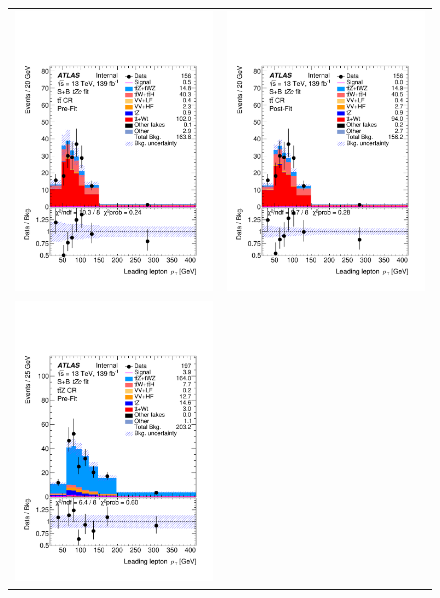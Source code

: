\begin{figure}[htbp]
	\centering
	\begin{tabular}{cc}
		\includegraphics[width=.45\textwidth]{Chapters/CH8/figures/SPLUSB_CRSR_DL1rc_unblind/Plots/TTCR} &
		\includegraphics[width=.45\textwidth]{Chapters/CH8/figures/SPLUSB_CRSR_DL1rc_unblind/Plots/TTCR_postFit} \\
		\includegraphics[width=.45\textwidth]{Chapters/CH8/figures/SPLUSB_CRSR_DL1rc_unblind/Plots/TTZCR} &

\end{tabular}
\end{figure}
